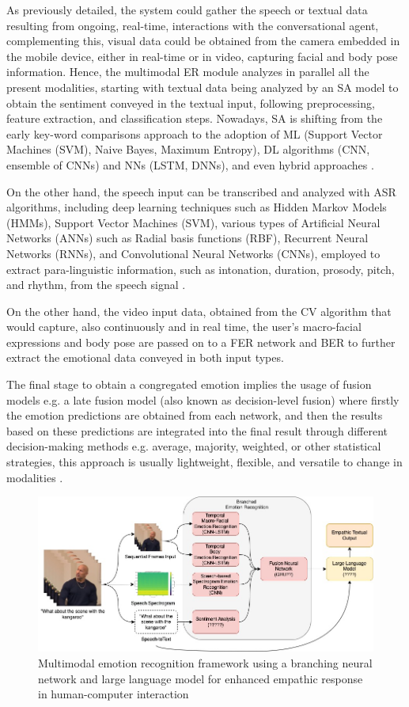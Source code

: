 \documentclass[runningheads]{llncs}
\begin{document}
As previously detailed, the system could gather the speech or textual data resulting from ongoing, real-time, interactions with the conversational agent, complementing this, visual data could be obtained from the camera embedded in the mobile device, either in real-time or in video, capturing facial and body pose information. Hence, the multimodal ER module analyzes in parallel all the present modalities, starting with textual data being analyzed by an SA model to obtain the sentiment conveyed in the textual input, following preprocessing, feature extraction, and classification steps. Nowadays, SA is shifting from the early key-word comparisons approach to the adoption of ML (Support Vector Machines (SVM), Naive Bayes, Maximum Entropy), DL algorithms (CNN, ensemble of CNNs) and NNs (LSTM, DNNs), and even hybrid approaches \cite{hung_beyond_2023}.

On the other hand, the speech input can be transcribed and analyzed with ASR algorithms, including deep learning techniques such as Hidden Markov Models (HMMs), Support Vector Machines (SVM), various types of Artificial Neural Networks (ANNs) such as Radial basis functions (RBF), Recurrent Neural Networks (RNNs), and Convolutional Neural Networks (CNNs), employed to extract para-linguistic information, such as intonation, duration, prosody, pitch, and rhythm, from the speech signal \cite{malik_automatic_2021}.

On the other hand, the video input data, obtained from the CV algorithm that would capture,  also continuously and in real time, the user's macro-facial expressions and body pose are passed on to a FER network and BER to further extract the emotional data conveyed in both input types.

The final stage to obtain a congregated emotion implies the usage of fusion models e.g. a late fusion model (also known as decision-level fusion) where firstly the emotion predictions are obtained from each network, and then the results based on these predictions are integrated into the final result through different decision-making methods e.g. average, majority, weighted, or other statistical strategies, this approach is usually lightweight, flexible, and versatile to change in modalities \cite{zhu_multimodal_2023}.
\begin{figure}[htb]
	\centering
	\includegraphics[width=0.97\linewidth]{approachArchitecture.jpg}
	\caption{Multimodal emotion recognition framework using a branching neural network and large language model for enhanced empathic response in human-computer interaction}
	\label{fig:approachArchitecture}
\end{figure}
\end{document}
